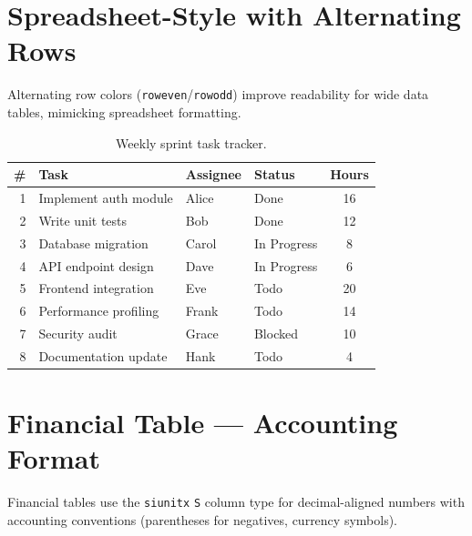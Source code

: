 \documentclass[
    language=english,
    doctype=article,
    institution=none,
]{../../omnilatex}
\begin{document}
\section{Spreadsheet-Style with Alternating Rows}
\label{sec:spreadsheet}

Alternating row colors (\texttt{roweven}/\texttt{rowodd}) improve readability for
wide data tables, mimicking spreadsheet formatting.

\begin{table}[htbp]
    \centering
    \caption{Weekly sprint task tracker.}
    \label{tab:spreadsheet}
    \begin{tabular}{r l l l c}
        \toprule
        \rowcolor{headerblue!15}
        \textbf{\#} & \textbf{Task} & \textbf{Assignee} & \textbf{Status} & \textbf{Hours} \\
        \midrule
        1  & Implement auth module    & Alice  & Done     & 16 \\
        2  & Write unit tests         & Bob    & Done     & 12 \\
        3  & Database migration       & Carol  & In Progress & 8  \\
        4  & API endpoint design      & Dave   & In Progress & 6  \\
        5  & Frontend integration     & Eve    & Todo     & 20 \\
        6  & Performance profiling    & Frank  & Todo     & 14 \\
        7  & Security audit           & Grace  & Blocked  & 10 \\
        8  & Documentation update     & Hank   & Todo     & 4  \\
        \bottomrule
    \end{tabular}
\end{table}

\section{Financial Table — Accounting Format}
\label{sec:financial}

Financial tables use the \texttt{siunitx} \texttt{S} column type for decimal-aligned
numbers with accounting conventions (parentheses for negatives, currency symbols).
\end{document}
